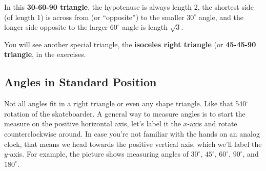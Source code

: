 \begin{center}
\end{center}

In this \textbf{30-60-90 triangle}, the hypotenuse is always length 2, the shortest side (of length 1) is across from (or ``opposite'') to the smaller $30^\circ$ angle, and the longer side opposite to the larger $60^\circ$ angle is length $\sqrt{3}$.

You will see another special triangle, the \textbf{isoceles right triangle} (or \textbf{45-45-90 triangle}, in the exercises.

\subsection*{Angles in Standard Position}

Not all angles fit in a right triangle or even any shape triangle.  Like that 540$^\circ$ rotation of the skateboarder.  A general way to measure angles is to start the measure on the positive horizontal axis, let's label it the $x$-axis and rotate counterclockwise around.  In case you're not familiar with the hands on an analog clock, that means we head towards the positive vertical axis, which we'll label the $y$-axis.  For example, the picture shows measuring angles of $30^\circ$, $45^\circ$, $60^\circ$,  $90^\circ$, and $180^\circ$.



